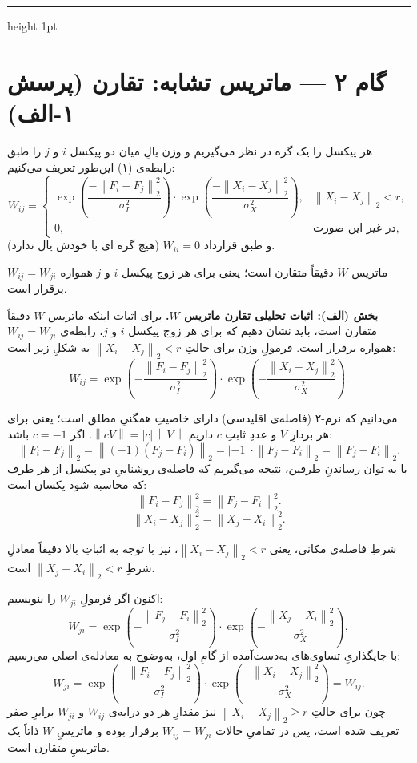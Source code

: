 \documentclass[14pt]{extarticle}
\newcommand{\norm}[1]{\left\lVert #1 \right\rVert}
\begin{document}
\vspace{4pt}
{\color{headblue!40}\hrule height 1pt}
\vspace{10pt}

\section{گام ۲ --- ماتریس تشابه: تقارن (پرسش ۱-الف)}

هر پیکسل را یک گره در نظر می‌گیریم و وزن یالِ میان دو پیکسل $i$ و $j$ را طبق رابطه‌ی (۱) این‌طور تعریف می‌کنیم:
\[
W_{ij}=
\begin{cases}
\exp\!\left(\dfrac{-\norm{F_i-F_j}_2^{2}}{\sigma_I^{2}}\right)\cdot
\exp\!\left(\dfrac{-\norm{X_i-X_j}_2^{2}}{\sigma_X^{2}}\right), & \norm{X_i-X_j}_2 < r,\\[12pt]
0, & \text{در غیر این صورت,}
\end{cases}
\]
و طبق قرارداد $W_{ii}=0$ (هیچ گره ای با خودش یال ندارد).

\begin{claimx}
ماتریس $W$ دقیقاً متقارن است؛ یعنی برای هر زوج پیکسل $i$ و $j$ همواره $W_{ij}=W_{ji}$ برقرار است.
\end{claimx}

\noindent\textbf{بخش (الف): اثبات تحلیلی تقارن ماتریس $W$.}
برای اثبات اینکه ماتریس $W$ دقیقاً متقارن است، باید نشان دهیم که برای هر زوج پیکسل $i$ و $j$، رابطه‌ی $W_{ij}=W_{ji}$ همواره برقرار است. فرمولِ وزن برای حالتِ $\norm{X_i-X_j}_2<r$ به شکلِ زیر است:
\[
W_{ij}=\exp\!\left(-\frac{\norm{F_i-F_j}_2^{2}}{\sigma_I^{2}}\right)\cdot
\exp\!\left(-\frac{\norm{X_i-X_j}_2^{2}}{\sigma_X^{2}}\right).
\]

\begin{proofx}
می‌دانیم که نرم-۲ (فاصله‌ی اقلیدسی) دارای خاصیتِ همگنیِ مطلق است؛ یعنی برای هر بردارِ $V$ و عددِ ثابتِ $c$ داریم $\norm{cV}=|c|\,\norm{V}$. اگر $c=-1$ باشد:
\[
\norm{F_i-F_j}_2=\norm{(-1)(F_j-F_i)}_2=|-1|\cdot\norm{F_j-F_i}_2=\norm{F_j-F_i}_2 .
\]
با به توان رساندنِ طرفین، نتیجه می‌گیریم که فاصله‌ی روشناییِ دو پیکسل از هر طرف که محاسبه شود یکسان است:
\[
\norm{F_i-F_j}_2^{2}=\norm{F_j-F_i}_2^{2} .
\]
\[
\norm{X_i-X_j}_2^{2}=\norm{X_j-X_i}_2^{2} .
\]

شرطِ فاصله‌ی مکانی، یعنی $\norm{X_i-X_j}_2<r$، نیز با توجه به اثباتِ بالا دقیقاً معادلِ شرطِ $\norm{X_j-X_i}_2<r$ است.

اکنون اگر فرمولِ $W_{ji}$ را بنویسیم:
\[
W_{ji}=\exp\!\left(-\frac{\norm{F_j-F_i}_2^{2}}{\sigma_I^{2}}\right)\cdot
\exp\!\left(-\frac{\norm{X_j-X_i}_2^{2}}{\sigma_X^{2}}\right),
\]
با جایگذاریِ تساوی‌های به‌دست‌آمده از گامِ اول، به‌وضوح به معادله‌ی اصلی می‌رسیم:
\[
W_{ji}=\exp\!\left(-\frac{\norm{F_i-F_j}_2^{2}}{\sigma_I^{2}}\right)\cdot
\exp\!\left(-\frac{\norm{X_i-X_j}_2^{2}}{\sigma_X^{2}}\right)=W_{ij}.
\]
چون برای حالتِ $\norm{X_i-X_j}_2\ge r$ نیز مقدارِ هر دو درایه‌ی $W_{ij}$ و $W_{ji}$ برابرِ صفر تعریف شده است، پس در تمامیِ حالات $W_{ij}=W_{ji}$ برقرار بوده و ماتریسِ $W$ ذاتاً یک ماتریسِ متقارن است.
\end{proofx}
\end{document}
